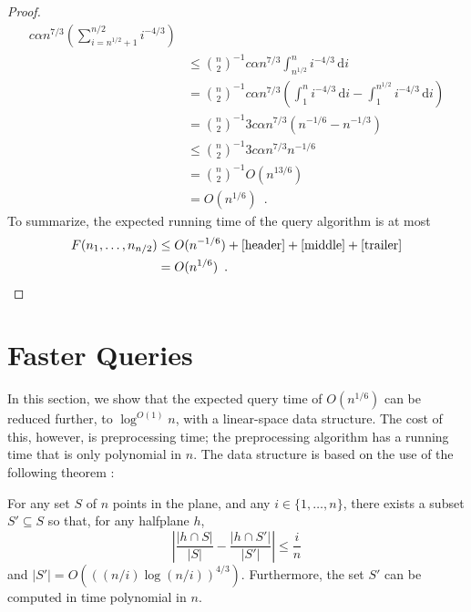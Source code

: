 \documentclass{cccg12}
\begin{document}
\begin{proof}
\begin{align*}
       c\alpha n^{7/3}\left(\sum_{i=n^{1/2}+1}^{n/2} i^{-4/3} \right) \\
      & \le \binom{n}{2}^{-1}
       c\alpha n^{7/3}\int_{n^{1/2}}^{n} i^{-4/3}\,\mathrm{d}i \\
      & = \binom{n}{2}^{-1} 
       c\alpha n^{7/3}\left(\int_{1}^{n} i^{-4/3}\,\mathrm{d}i
         - \int_{1}^{n^{1/2}} i^{-4/3}\,\mathrm{d}i  \right) \\
      & = \binom{n}{2}^{-1} 
       3c\alpha n^{7/3}\left(n^{-1/6} - n^{-1/3}\right) \\
      & \le \binom{n}{2}^{-1} 
       3c\alpha n^{7/3}n^{-1/6} \\
      & = \binom{n}{2}^{-1} O(n^{13/6}) \\
      & = O(n^{1/6}) \enspace .
  \end{align*}
  To summarize, the expected running time of the query algorithm is at most
  \begin{align*}
     F(n_1,\ldots,n_{n/2}) 
     & \le O(n^{-1/6})+\eqref{header} + \eqref{middle} + \eqref{trailer} \\
     & = O(n^{1/6}) \enspace . \qedhere
  \end{align*}
\end{proof}


\section{Faster Queries}

In this section, we show that the expected query time of $O(n^{1/6})$
can be reduced further, to $\log^{O(1)} n$, with a linear-space
data structure.  The cost of this, however, is preprocessing time;
the preprocessing algorithm has a running time that is only polynomial
in $n$.  The data structure is based on the use of the following theorem
\cite[Theorem~1.4 and Corollary~3.3]{mww93}:

\begin{thm}
  For any set $S$ of $n$ points in the plane, and any $i\in\{1,\ldots,n\}$,
  there exists a subset $S'\subseteq S$ so that, for any halfplane $h$,
  \[  \left|\frac{|h\cap S|}{|S|} - \frac{|h\cap S'|}{|S'|}\right| \le \frac{i}{n} \] 
  and $|S'| = O(((n/i)\log (n/i))^{4/3})$.  Furthermore, the set $S'$
  can be computed in time polynomial in $n$.
\end{thm}

\newcommand{\Oh}{\tilde{O}}
\end{document}
